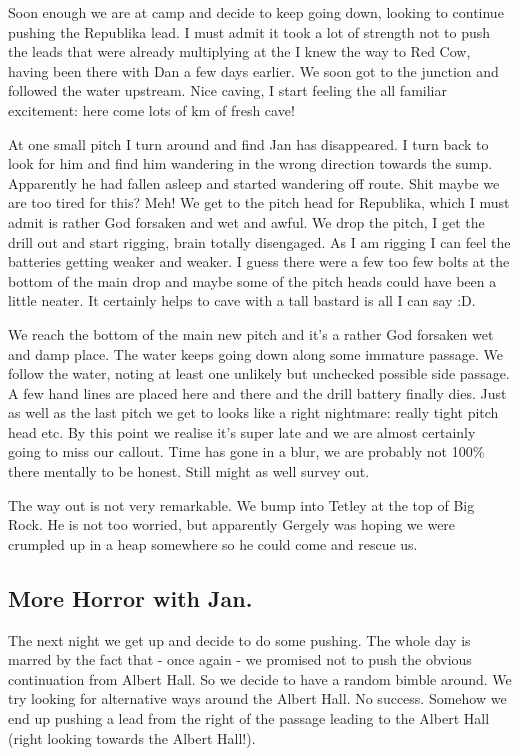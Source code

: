 Soon enough we are at camp and decide to keep going down, looking to
continue pushing the Republika lead. I must admit it took a lot of
strength not to push the leads that were already multiplying at the I
knew the way to Red Cow, having been there with Dan a few days earlier.
We soon got to the junction and followed the water upstream. Nice
caving, I start feeling the all familiar excitement: here come lots of
km of fresh cave!

At one small pitch I turn around and find Jan has disappeared. I turn
back to look for him and find him wandering in the wrong direction
towards the sump. Apparently he had fallen asleep and started wandering
off route. Shit maybe we are too tired for this? Meh! We get to the
pitch head for Republika, which I must admit is rather God forsaken and
wet and awful. We drop the pitch, I get the drill out and start rigging,
brain totally disengaged. As I am rigging I can feel the batteries
getting weaker and weaker. I guess there were a few too few bolts at the
bottom of the main drop and maybe some of the pitch heads could have
been a little neater. It certainly helps to cave with a tall bastard is
all I can say :D.

We reach the bottom of the main new pitch and it's a rather God forsaken
wet and damp place. The water keeps going down along some immature
passage. We follow the water, noting at least one unlikely but unchecked
possible side passage. A few hand lines are placed here and there and
the drill battery finally dies. Just as well as the last pitch we get to
looks like a right nightmare: really tight pitch head etc. By this point
we realise it's super late and we are almost certainly going to miss our
callout. Time has gone in a blur, we are probably not 100\% there
mentally to be honest. Still might as well survey out.

The way out is not very remarkable. We bump into Tetley at the top of
Big Rock. He is not too worried, but apparently Gergely was hoping we
were crumpled up in a heap somewhere so he could come and rescue us.


\subsection{More Horror with Jan.}

The next night we get up and decide to do some pushing. The whole day is
marred by the fact that - once again - we promised not to push the
obvious continuation from Albert Hall. So we decide to have a random
bimble around. We try looking for alternative ways around the Albert
Hall. No success. Somehow we end up pushing a lead from the right of the
passage leading to the Albert Hall (right looking towards the Albert
Hall!).

